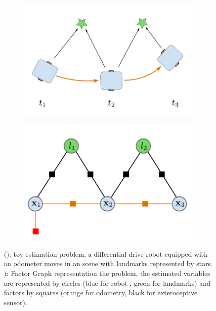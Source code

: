\begin{figure}[h]
    \centering
    \begin{subfigure}{.49\linewidth}
        \centering
        \includegraphics[width=\textwidth]{figures/toy_example.pdf}
        \caption{\label{fig:toy_problem}}
    \end{subfigure}%
    \hfill
    \begin{subfigure}{.49\linewidth}
        \centering
        \includegraphics[width=\textwidth]{figures/toy_factor.pdf}
        \caption{\label{fig:toy_factor}}
    \end{subfigure}%
    \caption{(): toy estimation problem, a differential drive robot equipped with an odometer moves in 
    an scene with landmarks represented by stars. ): Factor Graph representation the problem, the estimated variables are represented by circles 
    (blue for robot \keyframe, green for landmarks) and factors by squares (orange for odometry, black for exteroceptive sensor).}
\end{figure}


